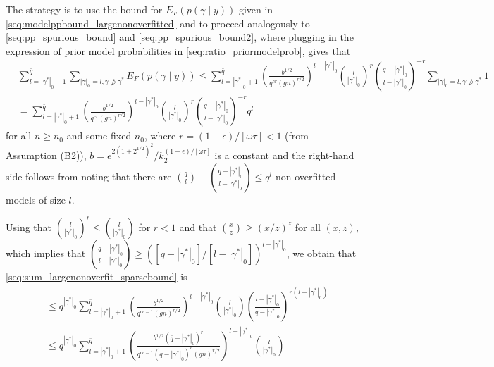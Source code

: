 The strategy is to use the bound for $E_F(p(\gamma \mid y))$ given in \eqref{seq:modelppbound_largenonoverfitted}
and to proceed analogously to \eqref{seq:pp_spurious_bound} and \eqref{seq:pp_spurious_bound2}, where plugging in the expression of prior model probabilities in \eqref{seq:ratio_priormodelprob}, gives that
\begin{align}
& \sum_{l=|\gamma^*|_0+1}^{\bar{q}} \sum_{|\gamma|_0=l, \gamma \not\supset \gamma^*} E_F( p(\gamma \mid y)) \leq
 \sum_{l=|\gamma^*|_0+1}^{\bar{q}} 
\left( \frac{b^{1/2}}{q^{cr} (g n)^{r/2}} \right)^{l - |\gamma^*|_0} 
{l \choose |\gamma^*|_0 }^{r} {q - |\gamma^*|_0 \choose l - |\gamma^*|_0}^{-r}
\sum_{|\gamma|_0=l, \gamma \not\supset \gamma^*} 1
\nonumber \\
&= \sum_{l=|\gamma^*|_0+1}^{\bar{q}}  \left( \frac{b^{1/2}}{q^{cr} (g n)^{r/2}} \right)^{l - |\gamma^*|_0}  {l \choose |\gamma^*|_0 }^{r} {q - |\gamma^*|_0 \choose l - |\gamma^*|_0}^{-r} q^l
\label{seq:sum_largenonoverfit_sparsebound}
\end{align}
for all $n \geq n_0$ and some fixed $n_0$, where $r=(1-\epsilon)/[\omega \tau] < 1$ (from Assumption (B2)),
$b= e^{2(1+2^{1/2})^2}/k_2^{(1-\epsilon)/[\omega \tau]}$ is a constant
and the right-hand side follows from noting that there are
${q \choose l} - {q - |\gamma^*|_0 \choose l - |\gamma^*|_0} \leq q^l$ non-overfitted models of size $l$.

Using that ${l \choose |\gamma^*|_0}^r \leq {l \choose |\gamma^*|_0}$ for $r<1$ and that ${x \choose z} \geq (x/z)^z$ for all $(x,z)$, which implies that
${q - |\gamma^*|_0 \choose l - |\gamma^*|_0} \geq ([q - |\gamma^*|_0]/[l-|\gamma^*|_0])^{l - |\gamma^*|_0}$, we obtain that \eqref{seq:sum_largenonoverfit_sparsebound} is
\begin{align}
&\leq q^{|\gamma^*|_0}
\sum_{l=|\gamma^*|_0+1}^{\bar{q}}  \left( \frac{b^{1/2}}{q^{cr-1} (g n)^{r/2}} \right)^{l - |\gamma^*|_0}  {l \choose |\gamma^*|_0 }
\left( \frac{l-|\gamma^*|_0}{q - |\gamma^*|_0} \right)^{r(l-|\gamma^*|_0)}
\nonumber \\
&\leq q^{|\gamma^*|_0}
\sum_{l=|\gamma^*|_0+1}^{\bar{q}}  \left( \frac{b^{1/2} (\bar{q}-|\gamma^*|_0)^r}{q^{cr-1} (q - |\gamma^*|_0)^r (g n)^{r/2}} \right)^{l - |\gamma^*|_0}  {l \choose |\gamma^*|_0 }
\label{seq:sum_largenonoverfit_sparsebound2}
\end{align}

